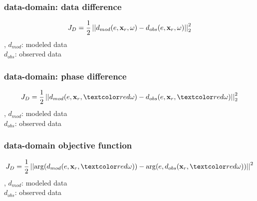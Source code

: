 \begin{frame} 
\end{frame}

\begin{frame} 
\end{frame}



\begin{frame}
\end{frame} 

\begin{frame}
\end{frame}

\begin{frame} 
\end{frame}

\begin{frame}
\end{frame}


\begin{frame}\frametitle{data-domain: data difference}
\huge
\[
J_{D} = \frac{1}{2} \left|\left|d_{mod}(e,{\bf x}_r,\omega)-d_{obs}(e,{\bf x}_r,\omega)\right|\right|^2_2
\]
\sep
$d_{mod}$: modeled data \\
\vfill
$d_{obs}$: observed data
\end{frame}

\begin{frame}\frametitle{data-domain: phase difference}
\huge
\[
J_{D} = \frac{1}{2} \norm{d_{mod}(e,\xx_r,\red{\omega})-d_{obs}(e,\xx_r,\red{\omega})}^2_2
\]
\sep
$d_{mod}$: modeled data \\
\vfill
$d_{obs}$: observed data
\end{frame}

\begin{frame}\frametitle{data-domain objective function}
\huge
\[
J_{D} = \frac{1}{2} \norm{\arg(d_{mod}(e,\xx_r,\red{\omega}))-\arg(e,d_{obs}(\xx_r,\red{\omega}))}^2
\]
\sep
$d_{mod}$: modeled data \\
\vfill
$d_{obs}$: observed data
\end{frame}



